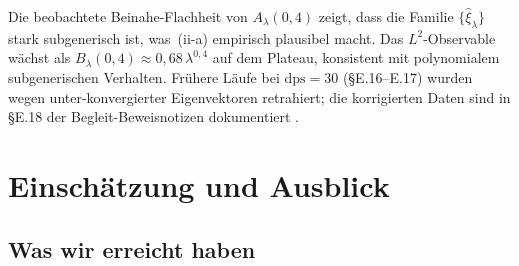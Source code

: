 \documentclass[12pt,a4paper]{article}
\theoremstyle{definition}
\theoremstyle{remark}
\begin{document}
Die beobachtete Beinahe-Flachheit von $A_\lambda(0{,}4)$ zeigt, dass die Familie $\{\hat\xi_\lambda\}$
stark subgenerisch ist, was~(ii-a) empirisch plausibel macht.
Das $L^2$-Observable wächst als $B_\lambda(0{,}4) \approx 0{,}68\,\lambda^{0{,}4}$ auf dem Plateau,
konsistent mit polynomialem subgenerischen Verhalten.
Frühere Läufe bei $\mathrm{dps}=30$ (\S E.16--E.17) wurden wegen unter-konvergierter Eigenvektoren retrahiert; die korrigierten Daten sind in \S E.18
der Begleit-Beweisnotizen dokumentiert \cite{Geiger2026evendom}.


\section{Einschätzung und Ausblick}
\label{sec:outlook}

\subsection{Was wir erreicht haben}
\end{document}

